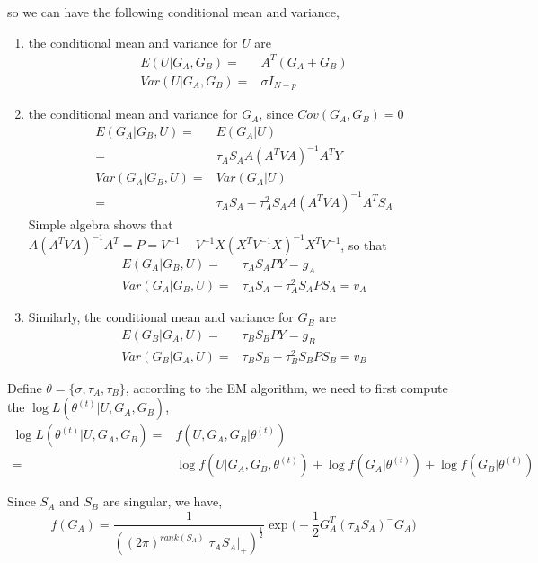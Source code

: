 \documentclass{article}
\begin{document}
    so we can have the following conditional mean and variance,
    \begin{enumerate}
        \item the conditional mean and variance for $U$ are
            \[\begin{split}
                E(U|G_A,G_B)=&A^T(G_A+G_B)\\
                Var(U|G_A,G_B) = & \sigma I_{N-p} 
            \end{split}\]
        \item the conditional mean and variance for $G_A$, since $Cov(G_A,G_B)=0$
            \[\begin{split}
                E(G_A|G_B,U)=&E(G_A|U)\\
                                           =&\tau_AS_AA(A^TVA)^{-1}A^TY\\
                Var(G_A|G_B,U)=&Var(G_A|U)\\
                                               =&\tau_AS_A-\tau_A^2S_AA(A^TVA)^{-1}A^TS_A
            \end{split}\]
            Simple algebra shows that $A(A^TVA)^{-1}A^T=P=V^{-1}-V^{-1}X(X^TV^{-1}X)^{-1}X^TV^{-1}$, so that
            \[\begin{split}
                E(G_A|G_B,U)=&\tau_AS_APY=g_A\\
                Var(G_A|G_B,U)=&\tau_AS_A-\tau_A^2S_APS_A=v_A
            \end{split}\]
        \item Similarly, the conditional mean and variance for $G_B$ are 
             \[\begin{split}
                E(G_B|G_A,U)=&\tau_BS_BPY=g_B\\
                Var(G_B|G_A,U)=&\tau_BS_B-\tau_B^2S_BPS_B=v_B
            \end{split}\]           
    \end{enumerate}
        
    Define $\theta=\{\sigma,\tau_A,\tau_B\}$, according to the EM algorithm, we need to first compute the $\log L(\theta^{(t)}|U,G_A,G_B)$,
    \[\begin{split}
        \log L(\theta^{(t)}|U,G_A,G_B)=&f(U,G_A,G_B|\theta^{(t)})\\
                                                                 =&\log f(U|G_A,G_B,\theta^{(t)})+\log f(G_A|\theta^{(t)})+\log f(G_B|\theta^{(t)})
    \end{split}\]
    
    Since $S_A$ and $S_B$ are singular, we have,
    \[
        f(G_A)=\dfrac{1}{((2\pi)^{rank(S_A)}|\tau_AS_A|_+)^{\frac{1}{2}}}\exp\Big (-\dfrac{1}{2}G_A^T(\tau_AS_A)^-G_A\Big)
    \]
\end{document}
